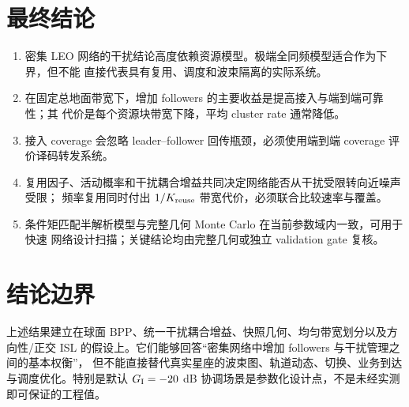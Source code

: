 \documentclass[UTF8,a4paper,11pt]{ctexart}
\begin{document}
\section{最终结论}

\begin{enumerate}
  \item 密集 LEO 网络的干扰结论高度依赖资源模型。极端全同频模型适合作为下界，但不能
  直接代表具有复用、调度和波束隔离的实际系统。
  \item 在固定总地面带宽下，增加 followers 的主要收益是提高接入与端到端可靠性；其
  代价是每个资源块带宽下降，平均 cluster rate 通常降低。
  \item 接入 coverage 会忽略 leader--follower 回传瓶颈，必须使用端到端 coverage
  评价译码转发系统。
  \item 复用因子、活动概率和干扰耦合增益共同决定网络能否从干扰受限转向近噪声受限；
  频率复用同时付出 $1/K_{\rm reuse}$ 带宽代价，必须联合比较速率与覆盖。
  \item 条件矩匹配半解析模型与完整几何 Monte Carlo 在当前参数域内一致，可用于快速
  网络设计扫描；关键结论均由完整几何或独立 validation gate 复核。
\end{enumerate}

\section{结论边界}

上述结果建立在球面 BPP、统一干扰耦合增益、快照几何、均匀带宽划分以及方向性/正交
ISL 的假设上。它们能够回答“密集网络中增加 followers 与干扰管理之间的基本权衡”，
但不能直接替代真实星座的波束图、轨道动态、切换、业务到达与调度优化。特别是默认
$G_{\rm I}=-20$ dB 协调场景是参数化设计点，不是未经实测即可保证的工程值。
\end{document}
